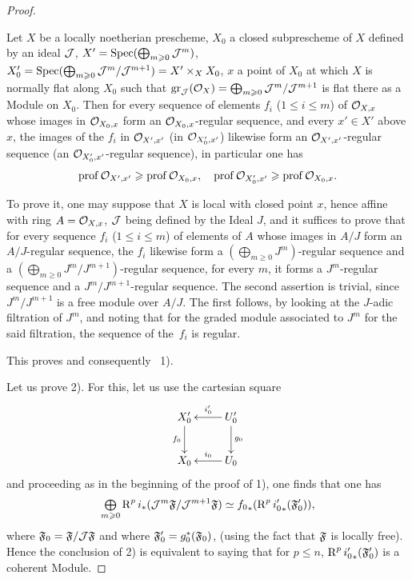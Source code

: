\begin{proof}
\begin{lemma} \label{XII.4.2}
Let $X$ be a locally noetherian prescheme, $X_0$ a closed subprescheme of $X$ defined by an ideal ${\mathcal J}$, $X'=\operatorname{Spec}(\bigoplus_{m\geqslant 0} {\mathcal J}^m)$, $X_0'=\operatorname{Spec}(\bigoplus_{m\geqslant 0} {\mathcal J}^m/{\mathcal J}^{m+1}) = X'\times_XX_0$, $x$ a point of $X_0$ at which $X$ is normally flat along $X_0$ \ie such that $\operatorname{gr}_{{\mathcal J}}(\mathcal{O}_X)= \bigoplus_{m\geqslant 0}{\mathcal J}^m/{\mathcal J}^{m+1}$ is flat there as a Module on $X_0$. Then for every sequence of elements $f_i$ ($1\leq i\leq m$) of ${\mathcal O}_{X, x}$ whose images in ${\mathcal O}_{X_0, x}$ form an ${\mathcal O}_{X_0, x}$-regular sequence, and every $x'\in X'$ above $x$, the images of the $f_i$ in ${\mathcal O}_{X', x'}$ (\resp in ${\mathcal O}_{X'_0, x'}$) likewise form an ${\mathcal O}_{X', x'}$-regular sequence (\resp an ${\mathcal O}_{X'_0, x'}$-regular sequence), in particular one has
\steco
\begin{equation} \label{eq:XII.23}
\operatorname{prof} {\mathcal O}_{X', x'} \geqslant \operatorname{prof} {\mathcal O}_{X_0, x}, \quad \operatorname{prof} {\mathcal O}_{X'_0, x'} \geqslant \operatorname{prof} {\mathcal O}_{X_0, x}.
\end{equation}
\end{lemma}

To prove it, one may suppose that $X$ is local with closed point $x$, hence affine with ring $A={\mathcal O}_{X, x}$, ${\mathcal J}$ being defined by the Ideal $J$, and it suffices to prove that for every sequence $f_i$ ($1\leq i\leq m$) of elements of $A$ whose images in $A/J$ form an $A/J$-regular sequence, the $f_i$ likewise form a $(\bigoplus_{m\geq 0} J^m)$-regular sequence and a $(\bigoplus_{m\geq 0} J^m/J^{m+1})$-regular sequence, \ie for every $m$, it forms a $J^m$-regular sequence and a $J^m/J^{m+1}$-regular sequence. The second assertion is trivial, since $J^m/J^{m+1}$ is a free module over $A/J$. The first follows, by looking at the $J$-adic filtration of $J^m$, and noting that for the graded module associated to $J^m$ for the said filtration, the sequence of the~$f_i$ is regular.

This proves  and consequently ~1).

Let us prove  2). For this, let us use the cartesian square
\[
\xymatrix{
X'_0\ar[d]_{f_0}&\ar[l]_-{i'_0} U'_0\ar[d]^{g_0} \\
X_0&\ar[l]_-{i_0} U_0
}
\]
and proceeding as in the beginning of the proof of 1), one finds that one has
\steco
\begin{equation} \label{eq:XII.24}
\mathop{\textstyle\bigoplus}\limits_{m\geqslant 0} \operatorname{R}^pi_\ast({\mathcal J}^m\mathfrak{F}/{\mathcal J}^{m+1}\mathfrak{F}) \simeq {f_0}_\ast (\operatorname{R}^p{i'_0}_\ast(\mathfrak{F}_0')),
\end{equation}
where $\mathfrak{F}_0=\mathfrak{F}/{\mathcal J}\mathfrak{F}$ and where $\mathfrak{F}_0'=g_0^\ast(\mathfrak{F}_0)$, (using the fact that $\mathfrak{F}$ is locally free). Hence the conclusion of 2) is equivalent to saying that for $p\leq n$, $\operatorname{R}^p{i'_0}_\ast(\mathfrak{F}_0')$ is a coherent Module.


\end{proof}

